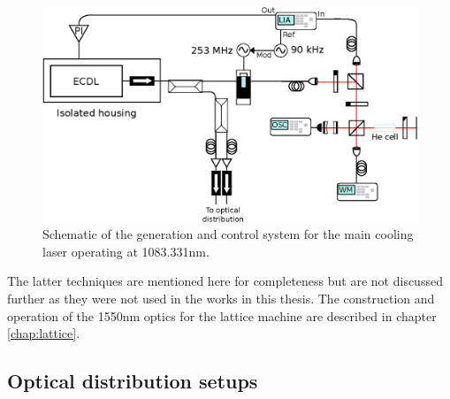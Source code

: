 	\begin{figure}
		\centering
		\includegraphics[width=\textwidth]{fig/apparatus/master_laser_system}
		\caption{Schematic of the generation and control system for the main cooling laser operating at 1083.331nm.
	 }
		\label{fig:main_laser}
	\end{figure}
	
	
	The latter techniques are mentioned here for completeness but are not discussed further as they were not used in the works in this thesis.
	The construction and operation of the 1550nm optics for the lattice machine are described in chapter \ref{chap:lattice}.



\subsection*{Optical distribution setups}


